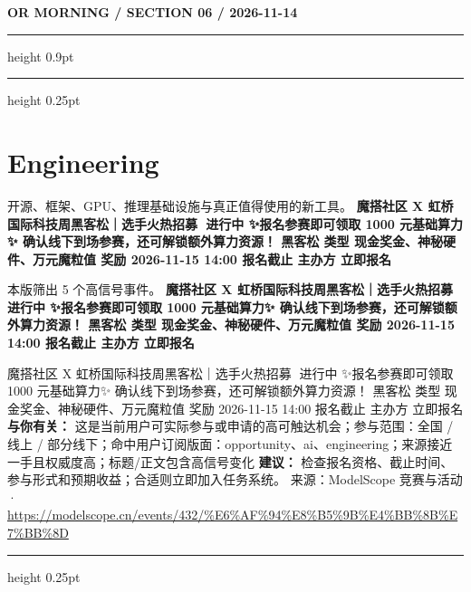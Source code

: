 \documentclass[10.5pt]{ctexart}
\begin{document}
\newpage
{\small\bfseries OR MORNING / SECTION 06 / 2026-11-14}
\vspace{2mm}
\hrule height 0.9pt
\vspace{1.5mm}
\hrule height 0.25pt
\vspace{4mm}
\section*{Engineering}
{\color{ormuted} 开源、框架、GPU、推理基础设施与真正值得使用的新工具。}
\vspace{2mm}
{\LARGE\bfseries 魔搭社区 X 虹桥国际科技周黑客松｜选手火热招募🚀 进行中 ✨报名参赛即可领取 1000 元基础算力✨ 确认线下到场参赛，还可解锁额外算力资源！ 黑客松 类型 现金奖金、神秘硬件、万元魔粒值 奖励 2026-11-15 14:00 报名截止 主办方 立即报名}\par
\vspace{1mm}
{\color{ormuted} 本版筛出 5 个高信号事件。}
\vspace{3mm}
{\Large\bfseries 魔搭社区 X 虹桥国际科技周黑客松｜选手火热招募🚀 进行中 ✨报名参赛即可领取 1000 元基础算力✨ 确认线下到场参赛，还可解锁额外算力资源！ 黑客松 类型 现金奖金、神秘硬件、万元魔粒值 奖励 2026-11-15 14:00 报名截止 主办方 立即报名}\par
魔搭社区 X 虹桥国际科技周黑客松｜选手火热招募🚀 进行中 ✨报名参赛即可领取 1000 元基础算力✨ 确认线下到场参赛，还可解锁额外算力资源！ 黑客松 类型 现金奖金、神秘硬件、万元魔粒值 奖励 2026-11-15 14:00 报名截止 主办方 立即报名
\textbf{与你有关：} 这是当前用户可实际参与或申请的高可触达机会；参与范围：全国 / 线上 / 部分线下；命中用户订阅版面：opportunity、ai、engineering；来源接近一手且权威度高；标题/正文包含高信号变化
\textbf{建议：} 检查报名资格、截止时间、参与形式和预期收益；合适则立即加入任务系统。
{\footnotesize\color{ormuted} 来源：ModelScope 竞赛与活动 · \url{https://modelscope.cn/events/432/%E6%AF%94%E8%B5%9B%E4%BB%8B%E7%BB%8D}}
\vspace{4mm}
\hrule height 0.25pt
\vspace{3mm}
\end{document}
